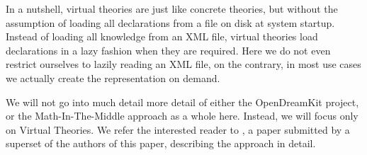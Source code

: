 In a nutshell, virtual theories are just like concrete theories, but without the assumption of loading all declarations from a file on disk at system startup. 
Instead of loading all knowledge from an XML file, virtual theories load declarations in a lazy fashion when they are required. 
Here we do not even restrict ourselves to lazily reading an XML file, on the contrary, in most use cases we actually create the \ommt representation on demand. 

We will not go into much detail more detail of either the OpenDreamKit project, or the Math-In-The-Middle approach as a whole here. 
Instead, we will focus only on Virtual Theories. 
We refer the interested reader to , a paper submitted by a superset of the authors of this paper, describing the approach in detail. 


